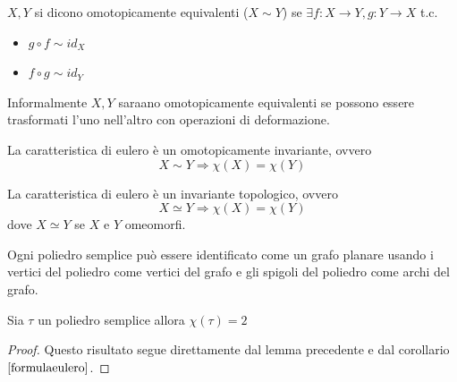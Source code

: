 \begin{definizione}
    \(X,Y\) si dicono omotopicamente equivalenti (\(X\sim Y\)) se \(\exists f : X \to Y, g:Y \to X \) t.c.
    \begin{itemize}
        \item \(g \circ f \sim id_X\)
        \item \(f \circ g \sim id_Y\)
    \end{itemize}
    Informalmente \(X,Y\) saraano omotopicamente equivalenti se possono essere trasformati l'uno nell'altro con operazioni di deformazione.
\end{definizione}

\begin{lemma}\label{om-inv}
    La caratteristica di eulero è un omotopicamente invariante, ovvero
    \begin{equation}
        X \sim Y \Rightarrow \chi (X) = \chi (Y)
    \end{equation}
\end{lemma}

\begin{proposizione}\label{inv-top}
    La caratteristica di eulero è un invariante topologico, ovvero
    \begin{equation}
        X \simeq Y \Rightarrow \chi (X) = \chi (Y)
    \end{equation}
    dove \(X \simeq Y\) se \(X\) e \(Y\) omeomorfi.
\end{proposizione}

\begin{lemma}
    Ogni poliedro semplice può essere identificato come un grafo planare usando i vertici del poliedro come vertici del grafo e gli spigoli del poliedro come archi del grafo.
\end{lemma}
\begin{proposizione}
    Sia \(\tau\) un poliedro semplice allora \(\chi(\tau)=2\)
    \begin{proof}
        Questo risultato segue direttamente dal lemma precedente e dal corollario \(\ref{formulaeulero}\).
    \end{proof}
\end{proposizione}